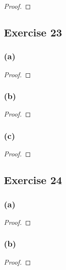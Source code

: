 \documentclass[14pt]{extarticle}
\begin{document}
\begin{proof}

\end{proof}

\subsection{Exercise 23}

\subsubsection{(a)}

\begin{proof}

\end{proof}

\subsubsection{(b)}

\begin{proof}

\end{proof}

\subsubsection{(c)}

\begin{proof}

\end{proof}

\subsection{Exercise 24}

\subsubsection{(a)}

\begin{proof}

\end{proof}

\subsubsection{(b)}

\begin{proof}

\end{proof}
\end{document}
